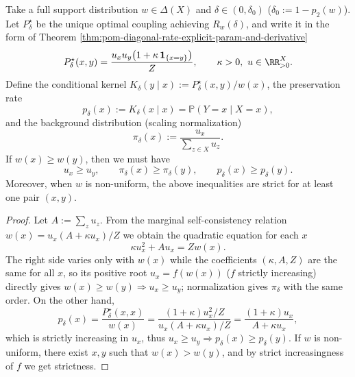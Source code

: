 \begin{proposition}\label{prop:pom-diagonal-rate-scaling-keep-comonotone}
Take a full support distribution \(w\in\Delta(X)\) and \(\delta\in(0,\delta_0)\) (\(\delta_0:=1-p_2(w)\)).
Let \(P^\star_\delta\) be the unique optimal coupling achieving \(R_w(\delta)\), and write it in the form of Theorem \ref{thm:pom-diagonal-rate-explicit-param-and-derivative}
\[
P^\star_\delta(x,y)=\frac{u_xu_y\bigl(1+\kappa\,\mathbf 1_{\{x=y\}}\bigr)}{Z},
\qquad
\kappa>0,\ u\in\RR_{>0}^X.
\]
Define the conditional kernel \(K_\delta(y\mid x):=P^\star_\delta(x,y)/w(x)\), the preservation rate
\[
p_\delta(x):=K_\delta(x\mid x)=\mathbb P(Y=x\mid X=x),
\]
and the background distribution (scaling normalization)
\[
\pi_\delta(x):=\frac{u_x}{\sum_{z\in X}u_z}.
\]
If \(w(x)\ge w(y)\), then we must have
\[
u_x\ge u_y,\qquad \pi_\delta(x)\ge \pi_\delta(y),\qquad p_\delta(x)\ge p_\delta(y).
\]
Moreover, when \(w\) is non-uniform, the above inequalities are strict for at least one pair \((x,y)\).
\end{proposition}
\begin{proof}
Let \(A:=\sum_z u_z\).
From the marginal self-consistency relation \(w(x)=u_x(A+\kappa u_x)/Z\) we obtain the quadratic equation for each \(x\)
\[
\kappa u_x^2+A u_x=Zw(x).
\]
The right side varies only with \(w(x)\) while the coefficients \((\kappa,A,Z)\) are the same for all \(x\), so its positive root \(u_x=f(w(x))\) (\(f\) strictly increasing) directly gives \(w(x)\ge w(y)\Rightarrow u_x\ge u_y\);
normalization gives \(\pi_\delta\) with the same order.
On the other hand,
\[
p_\delta(x)
=\frac{P^\star_\delta(x,x)}{w(x)}
=\frac{(1+\kappa)u_x^2/Z}{u_x(A+\kappa u_x)/Z}
=\frac{(1+\kappa)u_x}{A+\kappa u_x},
\]
which is strictly increasing in \(u_x\), thus \(u_x\ge u_y\Rightarrow p_\delta(x)\ge p_\delta(y)\).
If \(w\) is non-uniform, there exist \(x,y\) such that \(w(x)>w(y)\), and by strict increasingness of \(f\) we get strictness.
\end{proof}

